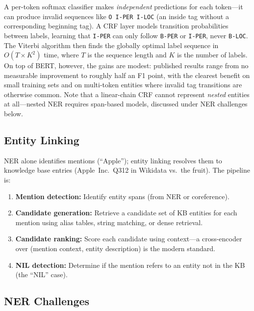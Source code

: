 \begin{keyinsight}
A per-token softmax classifier makes \emph{independent} predictions for each token---it can
produce invalid sequences like \texttt{O I-PER I-LOC} (an inside tag without a corresponding
beginning tag).  A CRF layer models transition probabilities between labels, learning that
\texttt{I-PER} can only follow \texttt{B-PER} or \texttt{I-PER}, never \texttt{B-LOC}.  The
Viterbi algorithm then finds the globally optimal label sequence in $O(T \times K^2)$ time,
where $T$ is the sequence length and $K$ is the number of labels.  On top of BERT, however,
the gains are modest: published results range from no measurable improvement to roughly half
an F1 point, with the clearest benefit on small training sets and on multi-token entities
where invalid tag transitions are otherwise common.  Note that a linear-chain CRF cannot
represent \emph{nested} entities at all---nested NER requires span-based models, discussed
under NER challenges below.
\end{keyinsight}

\subsection{Entity Linking}
\label{sec:entity_linking}

NER alone identifies mentions (``Apple''); entity linking resolves them to knowledge base
entries (Apple~Inc.\ Q312 in Wikidata vs.\ the fruit).  The pipeline is:

\begin{enumerate}[label=\textbf{\arabic*.}]
    \item \textbf{Mention detection:} Identify entity spans (from NER or coreference).
    \item \textbf{Candidate generation:} Retrieve a candidate set of KB entities for each
          mention using alias tables, string matching, or dense retrieval.
    \item \textbf{Candidate ranking:} Score each candidate using context---a cross-encoder
          over (mention context, entity description) is the modern standard.
    \item \textbf{NIL detection:} Determine if the mention refers to an entity not in the KB
          (the ``NIL'' case).
\end{enumerate}

\subsection{NER Challenges}

